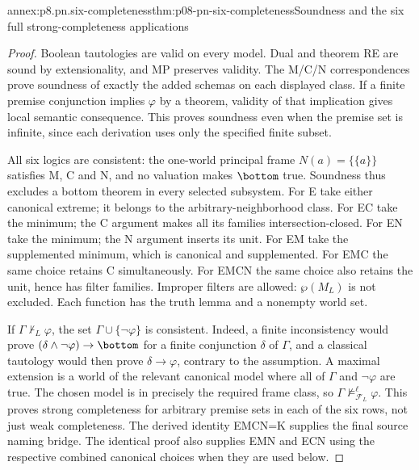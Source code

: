 \begin{annexitem}{annex:p8.pn.six-completeness}{thm:p08-pn-six-completeness}{Soundness and the six full strong-completeness applications}
\begin{proof}
Boolean tautologies are valid on every model. Dual and theorem
RE are sound by extensionality, and MP preserves validity.
The M/C/N correspondences prove soundness of exactly the added
schemas on each displayed class. If a finite premise conjunction
implies \(\varphi\) by a theorem, validity of that implication
gives local semantic consequence. This proves soundness even
when the premise set is infinite, since each derivation uses
only the specified finite subset.

All six logics are consistent: the one-world principal frame
\(N(a)=\{\{a\}\}\) satisfies M, C and N, and no valuation
makes \(\bottom\) true. Soundness thus excludes a bottom theorem
in every selected subsystem. For E take either canonical extreme;
it belongs to the arbitrary-neighborhood class. For EC take the
minimum; the C argument makes all its families intersection-closed.
For EN take the minimum; the N argument inserts its unit. For EM
take the supplemented minimum, which is canonical and supplemented.
For EMC the same choice retains C simultaneously. For EMCN the
same choice also retains the unit, hence has filter families.
Improper filters are allowed: \(\wp(M_L)\) is not excluded.
Each function has the truth lemma and a nonempty world set.

If \(\Gamma\not\vdash_L\varphi\), the set
\(\Gamma\cup\{\neg\varphi\}\) is consistent. Indeed, a
finite inconsistency would prove
\((\delta\land\neg\varphi)\to\bottom\) for a finite
conjunction \(\delta\) of \(\Gamma\), and a classical
tautology would then prove \(\delta\to\varphi\), contrary
to the assumption. A maximal extension is a world of the relevant
canonical model where all of \(\Gamma\) and \(\neg\varphi\)
are true. The chosen model is in precisely the required frame class,
so \(\Gamma\not\models^\ell_{\mathscr F_L}\varphi\).
This proves strong completeness for arbitrary premise sets in
each of the six rows, not just weak completeness. The derived
identity EMCN=K supplies the final source naming bridge.
The identical proof also supplies EMN and ECN using the respective
combined canonical choices when they are used below.
\end{proof}
\end{annexitem}


